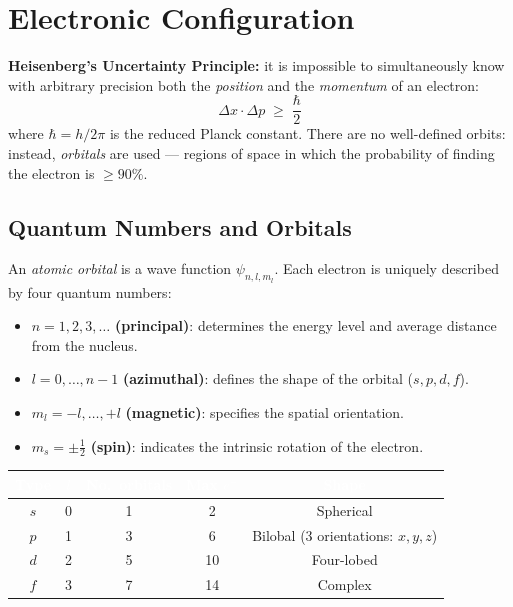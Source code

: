 \documentclass[a4paper,11pt]{article}
\newcommand{\altrow}{\rowcolors{2}{rowcolor}{white}}
\newcommand{\resetrow}{\rowcolors{0}{}{}}
\begin{document}
\clearpage

\section{Electronic Configuration}

\begin{attenzione}
\textbf{Heisenberg's Uncertainty Principle:} it is impossible to simultaneously know with arbitrary precision both the \textit{position} and the \textit{momentum} of an electron:
\[
\Delta x \cdot \Delta p \;\geq\; \frac{\hbar}{2}
\]
where $\hbar = h/2\pi$ is the reduced Planck constant. There are no well-defined orbits: instead, \textit{orbitals} are used --- regions of space in which the probability of finding the electron is $\geq 90\%$.
\end{attenzione}

\subsection{Quantum Numbers and Orbitals}

\begin{definizione}
An \textit{atomic orbital} is a wave function $\psi_{n,l,m_l}$. Each electron is uniquely described by four quantum numbers:
\begin{itemize}
  \item $n = 1,2,3,\ldots$ \textbf{(principal)}: determines the energy level and average distance from the nucleus.
  \item $l = 0,\ldots,n-1$ \textbf{(azimuthal)}: defines the shape of the orbital ($s,p,d,f$).
  \item $m_l = -l,\ldots,+l$ \textbf{(magnetic)}: specifies the spatial orientation.
  \item $m_s = \pm\tfrac{1}{2}$ \textbf{(spin)}: indicates the intrinsic rotation of the electron.
\end{itemize}
\end{definizione}

\altrow
\begin{center}
\begin{tabular}{ccccc}
\toprule
\rowcolor{epflred!85}
\textcolor{white}{\textbf{Type}} & \textcolor{white}{$l$} &
\textcolor{white}{\textbf{No.\ orbitals}} & \textcolor{white}{\textbf{Max $e^-$}} &
\textcolor{white}{\textbf{Shape}} \\
\midrule
$s$ & 0 & 1 &  2 & Spherical \\
$p$ & 1 & 3 &  6 & Bilobal (3 orientations: $x,y,z$) \\
$d$ & 2 & 5 & 10 & Four-lobed \\
$f$ & 3 & 7 & 14 & Complex \\
\bottomrule
\end{tabular}
\end{center}
\resetrow
\end{document}
